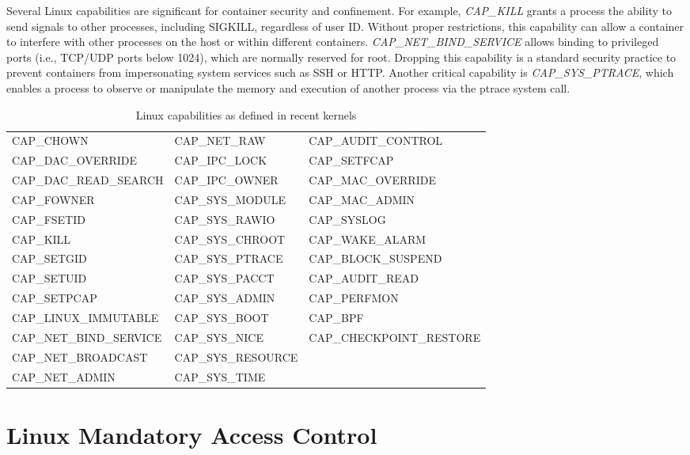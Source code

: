 \documentclass[12pt]{report}
\begin{document}
\begin{doublespace}
Several Linux capabilities are significant for container security and confinement. For example, \textit{CAP_KILL} grants a process the ability to send signals to other processes, including SIGKILL, regardless of user ID. Without proper restrictions, this capability can allow a container to interfere with other processes on the host or within different containers. \textit{CAP_NET_BIND_SERVICE} allows binding to privileged ports (i.e., TCP/UDP ports below 1024), which are normally reserved for root. Dropping this capability is a standard security practice to prevent containers from impersonating system services such as SSH or HTTP. Another critical capability is \textit{CAP_SYS_PTRACE}, which enables a process to observe or manipulate the memory and execution of another process via the ptrace system call.

\begin{table}[H]
  \centering
  \caption{Linux capabilities as defined in recent kernels \cite{kerrisk2025capabilities}}
  \label{table:linux-capabilities}
  \footnotesize
  \begin{tabular}{|l|l|l|}
    \hline
    CAP_CHOWN & CAP_NET_RAW & CAP_AUDIT_CONTROL \\
    CAP_DAC_OVERRIDE & CAP_IPC_LOCK & CAP_SETFCAP \\
    CAP_DAC_READ_SEARCH & CAP_IPC_OWNER & CAP_MAC_OVERRIDE \\
    CAP_FOWNER & CAP_SYS_MODULE & CAP_MAC_ADMIN \\
    CAP_FSETID & CAP_SYS_RAWIO & CAP_SYSLOG \\
    CAP_KILL & CAP_SYS_CHROOT & CAP_WAKE_ALARM \\
    CAP_SETGID & CAP_SYS_PTRACE & CAP_BLOCK_SUSPEND \\
    CAP_SETUID & CAP_SYS_PACCT & CAP_AUDIT_READ \\
    CAP_SETPCAP & CAP_SYS_ADMIN & CAP_PERFMON \\
    CAP_LINUX_IMMUTABLE & CAP_SYS_BOOT & CAP_BPF \\
    CAP_NET_BIND_SERVICE & CAP_SYS_NICE & CAP_CHECKPOINT_RESTORE \\
    CAP_NET_BROADCAST & CAP_SYS_RESOURCE & \\
    CAP_NET_ADMIN & CAP_SYS_TIME & \\
    \hline
  \end{tabular}
\end{table}


\section{Linux Mandatory Access Control}


\end{doublespace}
\end{document}
